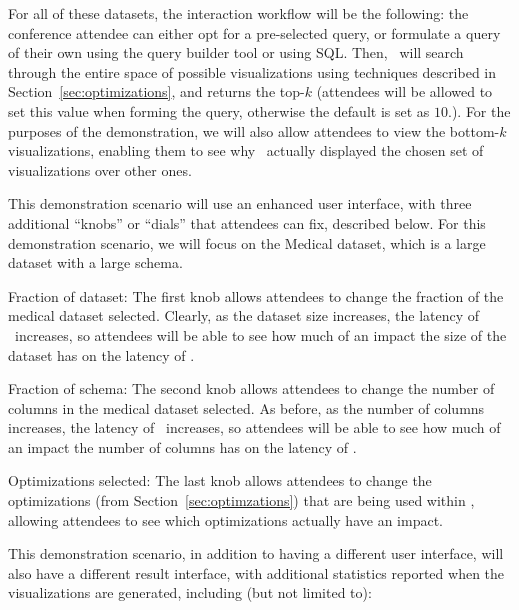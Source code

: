 \noindent {} For all of these
datasets, the interaction workflow will be the following: the
conference attendee can either opt for a pre-selected query, or
formulate a query of their own using the query builder tool or using
SQL. Then, \SeeDB\ will search through the entire space of possible
visualizations using techniques described in
Section~\ref{sec:optimizations}, and returns the top-$k$ (attendees
will be allowed to set this value when forming the query, otherwise
the default is set as $10$.). For the purposes of the demonstration,
we will also allow attendees to view the bottom-$k$ visualizations,
enabling them to see why \SeeDB\ actually displayed the chosen set of
visualizations over other ones.


 This demonstration
scenario will use an enhanced user interface, with three additional
``knobs'' or ``dials'' that attendees can fix, described below. For
this demonstration scenario, we will focus on the Medical dataset,
which is a large dataset with a large schema.

\squishlist
\item Fraction of dataset: The first knob allows attendees to change
  the fraction of the medical dataset selected. Clearly, as the
  dataset size increases, the latency of \SeeDB\ increases, so
  attendees will be able to see how much of an impact the size of the
  dataset has on the latency of \SeeDB.

\item Fraction of schema: The second knob allows attendees to change
  the number of columns in the medical dataset selected. As before, as
  the number of columns increases, the latency of \SeeDB\ increases,
  so attendees will be able to see how much of an impact the number of
  columns has on the latency of \SeeDB.

\item Optimizations selected: The last knob allows attendees to change
  the optimizations (from Section~\ref{sec:optimzations}) that are
  being used within \SeeDB, allowing attendees to see which
  optimizations actually have an impact.  \squishend

\noindent This demonstration scenario, in addition to having a
different user interface, will also have a different result interface,
with additional statistics reported when the visualizations are
generated, including (but not limited to):

